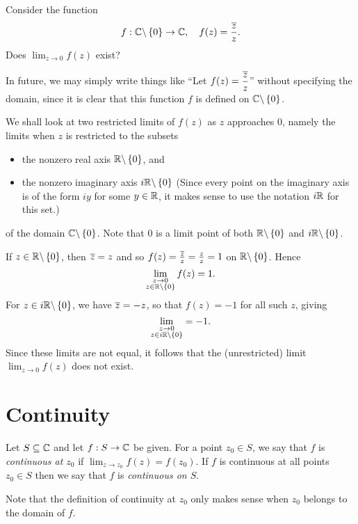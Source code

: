 \begin{example}
\label{e:rlim}
Consider the function 
\[
f: \mathbb{C} \backslash \left\{0\right\} \to \mathbb{C}, \quad f(z) = \frac{\overline{z}}{z}.
\]
Does 
$
\displaystyle \lim_{z \to 0} f(z)
$
exist?
\end{example}
\begin{note}
In future, we may simply write things like ``Let $f(z) = \dfrac{\overline{z}}{z}$'' without specifying the domain, since it is clear that this function $f$ is defined on $\mathbb{C} \backslash \left\{0\right\}$.
\end{note}
\begin{solution}
We shall look at two restricted limits of $f(z)$ as $z$ approaches $0$, namely the limits when $z$ is restricted to the subsets
\begin{itemize}
\item the nonzero real axis $\mathbb{R} \backslash \left\{0\right\}$, and
\item the nonzero imaginary axis $i \mathbb{R} \backslash \left\{0\right\}$ (Since every point on the imaginary axis is of the form $iy$ for some $y \in \mathbb{R}$, it makes sense to use the notation $i \mathbb{R}$ for this set.)
\end{itemize}
of the domain $\mathbb{C} \backslash \left\{0\right\}$.  Note that $0$ is a limit point of both $\mathbb{R} \backslash \left\{0\right\}$ and $i\mathbb{R} \backslash \left\{0\right\}$.


If $z \in \mathbb{R} \backslash \left\{0\right\}$, then $\overline{z} = z$ and so $f(z) = \frac{\overline{z}}{z} = \frac{z}{z} =1$ on $\mathbb{R} \backslash \left\{0\right\}$.  Hence
\[
\displaystyle \lim_{\substack{z \to 0 \\ z \in \mathbb{R} \backslash \left\{0\right\} }} f(z)=1.
\]
For $z \in i \mathbb{R} \backslash \left\{0\right\}$, we have $\overline{z}=-z$, so that $f(z)=-1$ for all such $z$, giving
\[
\displaystyle \lim_{\substack{z \to 0 \\ z \in i\mathbb{R} \backslash \left\{0\right\} }}=-1.
\]
Since  these limits are not equal, it follows that the (unrestricted) limit $\lim_{z \to 0} f(z)$ does not exist.
\end{solution}


\section{Continuity}

\begin{definition}
Let $S \subseteq \mathbb{C}$ and let $f:S \to \mathbb{C}$ be given.  For a point $z_0 \in S$, we say that $f$ is \emph{continuous at $z_0$} if $\lim_{z \to z_0 } f(z)=f(z_0)$. If $f$ is continuous at all points $z_0 \in S$ then we say that $f$ is \emph{continuous on $S$}.
\end{definition}
\begin{note}
Note that the definition of continuity at $z_0$ only makes sense when $z_0$ belongs to the domain of $f$.
\end{note}


